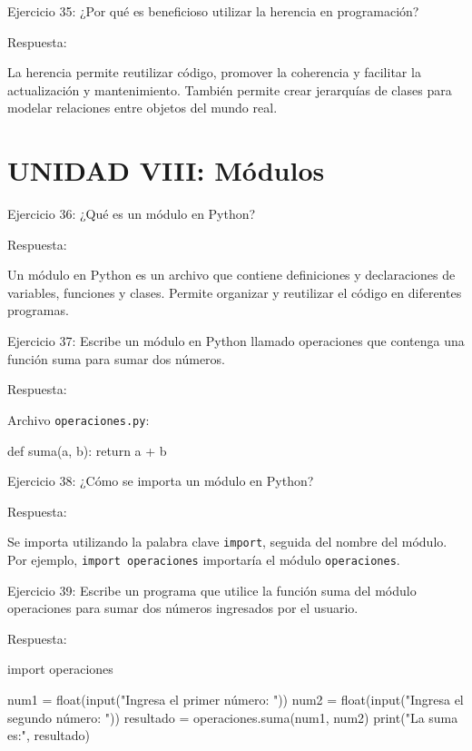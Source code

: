 \documentclass[
  a4paper,
  onepage,
  openany]{scrreprt}
\newenvironment{Shaded}{\begin{snugshade}}{\end{snugshade}}
\newcommand{\BuiltInTok}[1]{\textcolor[rgb]{0.00,0.23,0.31}{#1}}
\newcommand{\ControlFlowTok}[1]{\textcolor[rgb]{0.00,0.23,0.31}{#1}}
\newcommand{\ImportTok}[1]{\textcolor[rgb]{0.00,0.46,0.62}{#1}}
\newcommand{\KeywordTok}[1]{\textcolor[rgb]{0.00,0.23,0.31}{#1}}
\newcommand{\NormalTok}[1]{\textcolor[rgb]{0.00,0.23,0.31}{#1}}
\newcommand{\OperatorTok}[1]{\textcolor[rgb]{0.37,0.37,0.37}{#1}}
\newcommand{\StringTok}[1]{\textcolor[rgb]{0.13,0.47,0.30}{#1}}
\begin{document}
Ejercicio 35: ¿Por qué es beneficioso utilizar la herencia en
programación?

Respuesta:

La herencia permite reutilizar código, promover la coherencia y
facilitar la actualización y mantenimiento. También permite crear
jerarquías de clases para modelar relaciones entre objetos del mundo
real.

\hypertarget{unidad-viii-muxf3dulos-1}{%
\section{UNIDAD VIII: Módulos}\label{unidad-viii-muxf3dulos-1}}

Ejercicio 36: ¿Qué es un módulo en Python?

Respuesta:

Un módulo en Python es un archivo que contiene definiciones y
declaraciones de variables, funciones y clases. Permite organizar y
reutilizar el código en diferentes programas.

Ejercicio 37: Escribe un módulo en Python llamado operaciones que
contenga una función suma para sumar dos números.

Respuesta:

Archivo \texttt{operaciones.py}:

\begin{Shaded}
\begin{Highlighting}[]
\KeywordTok{def}\NormalTok{ suma(a, b):}
    \ControlFlowTok{return}\NormalTok{ a }\OperatorTok{+}\NormalTok{ b}
\end{Highlighting}
\end{Shaded}

Ejercicio 38: ¿Cómo se importa un módulo en Python?

Respuesta:

Se importa utilizando la palabra clave \texttt{import}, seguida del
nombre del módulo. Por ejemplo, \texttt{import\ operaciones} importaría
el módulo \texttt{operaciones}.

Ejercicio 39: Escribe un programa que utilice la función suma del módulo
operaciones para sumar dos números ingresados por el usuario.

Respuesta:

\begin{Shaded}
\begin{Highlighting}[]
\ImportTok{import}\NormalTok{ operaciones}

\NormalTok{num1 }\OperatorTok{=} \BuiltInTok{float}\NormalTok{(}\BuiltInTok{input}\NormalTok{(}\StringTok{"Ingresa el primer número: "}\NormalTok{))}
\NormalTok{num2 }\OperatorTok{=} \BuiltInTok{float}\NormalTok{(}\BuiltInTok{input}\NormalTok{(}\StringTok{"Ingresa el segundo número: "}\NormalTok{))}
\NormalTok{resultado }\OperatorTok{=}\NormalTok{ operaciones.suma(num1, num2)}
\BuiltInTok{print}\NormalTok{(}\StringTok{"La suma es:"}\NormalTok{, resultado)}
\end{Highlighting}
\end{Shaded}
\end{document}
